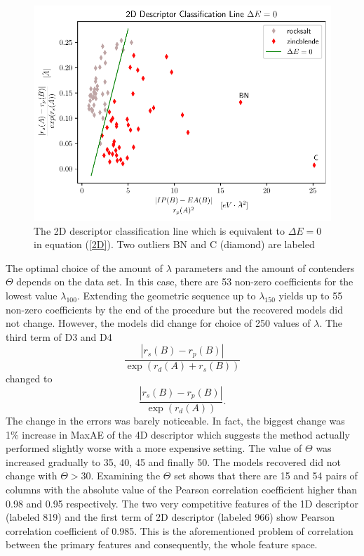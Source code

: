 \documentclass[11pt,oneside,czech,american]{book} %
\theoremstyle{definition} %
\theoremstyle{definition}
\begin{document}
\begin{figure}[H]
	\includegraphics[scale=1]{lasso.pdf}
	\caption{The 2D descriptor classification line which is equivalent to $\Delta E = 0$ in equation (\ref{2D}). Two outliers BN and C (diamond) are labeled}
	\label{line}
\end{figure}
The optimal choice of the amount of $\lambda$ parameters and the amount of contenders $\Theta$ depends on the data set. In this case, there are 53 non-zero coefficients for the lowest value $\lambda_{100}$. Extending the geometric sequence up to $\lambda_{150}$ yields up to 55 non-zero coefficients by the end of the procedure but the recovered models did not change. However, the models did change for choice of 250 values of $\lambda$. The third term of D3 and D4 $$\frac{|r_s(B)-r_p(B)|}{\exp(r_d(A)+r_s(B))}$$ changed to 
$$\frac{|r_s(B)-r_p(B)|}{\exp(r_d(A))}.$$
The change in the errors was barely noticeable. In fact, the biggest change was 1\% increase in MaxAE of the 4D descriptor which suggests the method actually performed slightly worse with a more expensive setting.
The value of $\Theta$ was increased gradually to 35, 40, 45 and finally 50. The models recovered did not change with $\Theta > 30$. Examining the $\Theta$ set shows that there are 15 and 54 pairs of columns with the absolute value of the Pearson correlation coefficient higher than 0.98 and 0.95 respectively. The two very competitive features of the 1D descriptor (labeled 819) and the first term of 2D descriptor (labeled 966) show Pearson correlation coefficient of 0.985. This is the aforementioned problem of correlation between the primary features and consequently, the whole feature space.
\end{document}

